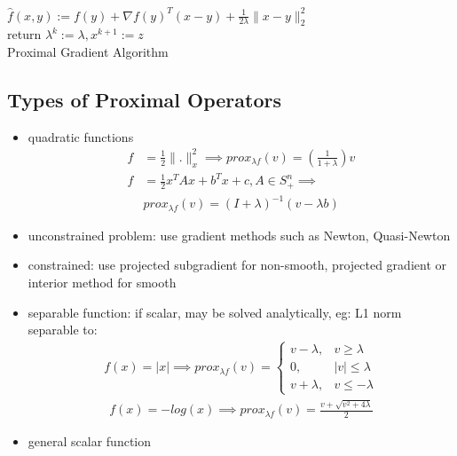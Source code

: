 \documentclass[8pt,letter]{article}
\begin{document}
\begin{multicols*}{2}
  \begin{algorithm}[H]
    $\hat{f}(x,y):=f(y) + \nabla f(y)^T(x-y) + \frac{1}{2\lambda}\|x-y\|^2_2$\\
    return $\lambda^k := \lambda, x^{k+1} := z$\\
    \caption{Proximal Gradient Algorithm\label{Algo_ProximalGradient}}
  \end{algorithm}

  \subsection{Types of Proximal Operators}
  \begin{itemize}
  \item quadratic functions
    \begin{align*}
      f&=\frac{1}{2} \|.\|_x^2 \implies prox_{\lambda f}(v) = (\frac{1}{1+\lambda})v\\
      f&=\frac{1}{2}x^T A x + b^T x + c, A \in S_+^n \implies\\
      &prox_{\lambda f}(v)=(I+\lambda)^{-1}(v-\lambda b)
    \end{align*}
  \item unconstrained problem: use gradient methods such as Newton, Quasi-Newton
  \item constrained: use projected subgradient for non-smooth, projected gradient or interior method for smooth
  \item separable function: if scalar, may be solved analytically, eg:
    L1 norm separable to:
    \begin{align*}
      f(x) = |x| \implies prox_{\lambda f}(v) =
      \begin{cases}
        v-\lambda ,& v \geq \lambda\\
        0,& |v| \leq \lambda\\
        v+\lambda, & v \leq -\lambda
      \end{cases}
    \end{align*}
    \begin{align*}
      f(x) = -log(x) \implies prox_{\lambda f}(v) = \frac{v+\sqrt{v^2+4\lambda}}{2}
    \end{align*}
  \item general scalar function
    \begin{itemize}

\end{itemize}
\end{itemize}
\end{multicols*}
\end{document}
